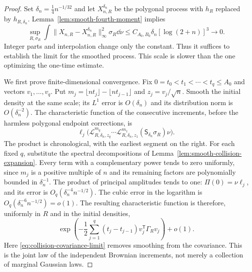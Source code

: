 \begin{proof}
Set $\delta_n=\tfrac14 n^{-1/32}$ and let $X_{n,R}^{\delta_n}$ be the
polygonal process with $h_R$ replaced by $h_{R,\delta_n}$.
Lemma~\ref{lem:smooth-fourth-moment} implies
\[
 \sup_{R,\sigma_R}\int\|X_{n,R}-X_{n,R}^{\delta_n}\|_\infty^2
             \sigma_R\dd\nu
       \le C_{A_0,B_0}\delta_n[\log(2+n)]^3\longrightarrow0.
\]
Integer parts and interpolation change only the constant. Thus it
suffices to establish the limit for the smoothed process. This scale
is slower than the one optimizing the one-time estimate.

We first prove finite-dimensional convergence. Fix
$0=t_0<t_1<\cdots<t_q\le A_0$ and vectors $v_1,\ldots,v_q$.
Put $m_j=\lfloor nt_j\rfloor-\lfloor nt_{j-1}\rfloor$ and
$z_j=v_j/\sqrt n$. Smooth the initial density at the same scale;
its $L^1$ error is $O(\delta_n)$ and its distribution norm is
$O(\delta_n^{-2})$. The characteristic function of the consecutive
increments, before the harmless polygonal endpoint corrections, is
\[
 \ell_j\bigl(\mathcal L_{R,\delta_n,z_q}^{m_q}\cdots
       \mathcal L_{R,\delta_n,z_1}^{m_1}
                   (\mathsf S_{\delta_n}\sigma_R)\nu\bigr).
\]
The product is chronological, with the earliest segment on the right.
For each fixed $q$, substitute the spectral decompositions of
Lemma~\ref{lem:smooth-collision-expansion}. Every term with a
complementary power tends to zero uniformly, since $m_j$ is a positive
multiple of $n$ and its remaining factors are polynomially bounded in
$\delta_n^{-1}$. The product of principal amplitudes tends to one:
$\Pi(0)=\nu\ell_j$, and its error is
$O_q(\delta_n^{-4}n^{-1/2})$. The cubic error in the logarithm is
$O_q(\delta_n^{-6}n^{-1/2})=o(1)$. The resulting characteristic function
is therefore, uniformly in $R$ and in the initial densities,
\[
 \exp\left(-\frac12\sum_{j=1}^q(t_j-t_{j-1})
            v_j^{\mathsf T}\Gamma_Rv_j\right)+o(1).
\]
Here \eqref{eq:collision-covariance-limit} removes smoothing from the
covariance. This is the joint law of the independent Brownian
increments, not merely a collection of marginal Gaussian laws.


\end{proof}
